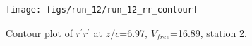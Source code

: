 \begin{figure}[H]
\centering
\texttt{[image: figs/run\_12/run\_12\_rr\_contour]}
\caption{Contour plot of $\overline{r^\prime r^\prime}$ at $z/c$=6.97, $V_{free}$=16.89, station 2.}
\label{fig:run_12_rr_contour}
\end{figure}


